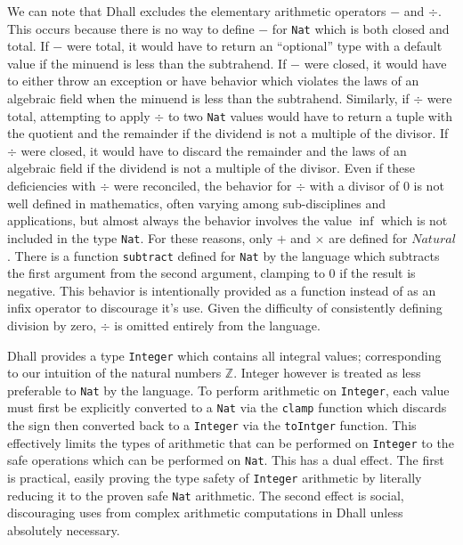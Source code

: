 \documentclass[12pt]{diazessay}
\newcommand{\Nat    }{\texttt{Nat}}
\newcommand{\Integer}{\texttt{Integer}}
\begin{document}
We can note that Dhall excludes the elementary arithmetic operators $-$ and $\div$.
This occurs because there is no way to define $-$ for \Nat{} which is both closed and total.
If $-$ were total, it would have to return an ``optional'' type with a default value if the minuend is less than the subtrahend.
If $-$ were closed, it would have to either throw an exception or have behavior which violates the laws of an algebraic field when the minuend is less than the subtrahend.
Similarly, if $\div$ were total, attempting to apply $\div$ to two \Nat{} values would have to return a tuple with the quotient and the remainder if the dividend is not a multiple of the divisor.
If $\div$ were closed, it would have to discard the remainder and the laws of an algebraic field if the dividend is not a multiple of the divisor.
Even if these deficiencies with $\div$ were reconciled, the behavior for $\div$ with a divisor of $0$ is not well defined in mathematics, often varying among sub-disciplines and applications, but almost always the behavior involves the value $\inf$ which is not included in the type \Nat{}.
For these reasons, only $+$ and $\times$ are defined for $Natural$.
There is a function \texttt{subtract} defined for \Nat{} by the language which subtracts the first argument from the second argument, clamping to $0$ if the result is negative.
This behavior is intentionally provided as a function instead of as an infix operator to discourage it's use.
Given the difficulty of consistently defining division by zero, $\div$ is omitted entirely from the language.

Dhall provides a type \Integer{} which contains all integral values; corresponding to our intuition of the natural numbers $\mathbb{Z}$.
Integer however is treated as less preferable to \Nat{} by the language.
To perform arithmetic on \Integer{}, each value must first be explicitly converted to a \Nat{} via the \texttt{clamp} function which discards the sign then converted back to a \Integer{} via the \texttt{toIntger} function.
This effectively limits the types of arithmetic that can be performed on \Integer{} to the safe operations which can be performed on \Nat{}.
This has a dual effect.
The first is practical, easily proving the type safety of \Integer{} arithmetic by literally reducing it to the proven safe \Nat{} arithmetic.
The second effect is social, discouraging uses from complex arithmetic computations in Dhall unless absolutely necessary.
\end{document}
